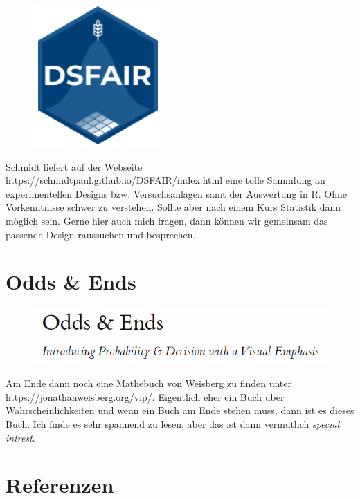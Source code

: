\documentclass[
  letterpaper,
]{scrbook}
\begin{document}
\begin{figure}

{\centering \includegraphics{./images/dsfair.png}

}

\end{figure}

Schmidt liefert auf der Webseite
\url{https://schmidtpaul.github.io/DSFAIR/index.html} eine tolle
Sammlung an experimentellen Designs bzw. Versuchsanlagen samt der
Auswertung in R. Ohne Vorkenntnisse schwer zu verstehen. Sollte aber
nach einem Kurs Statistik dann möglich sein. Gerne hier auch mich
fragen, dann können wir gemeinsam das passende Design raussuchen und
besprechen.

\hypertarget{odds-ends}{%
\section{Odds \& Ends}\label{odds-ends}}

\begin{figure}

{\centering \includegraphics{./images/odds_and_ends.PNG}

}

\end{figure}

Am Ende dann noch eine Mathebuch von Weisberg zu finden unter
\url{https://jonathanweisberg.org/vip/}. Eigentlich eher ein Buch über
Wahrscheinlichkeiten und wenn ein Buch am Ende stehen muss, dann ist es
dieses Buch. Ich finde es sehr spannend zu lesen, aber das ist dann
vermutlich \emph{special intrest}.

\hypertarget{referenzen}{%
\section*{Referenzen}\label{referenzen}}
\end{document}
